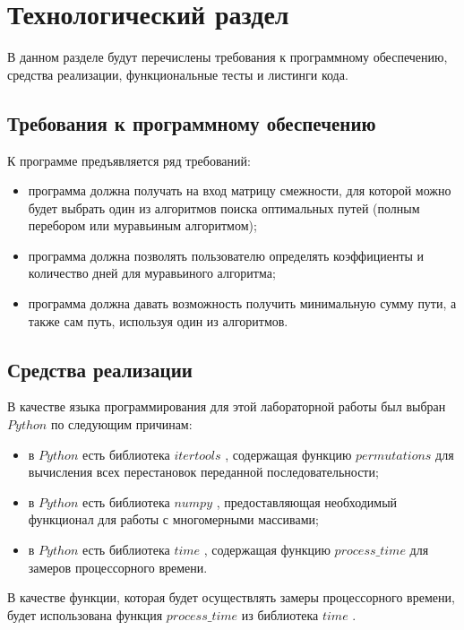 \chapter{Технологический раздел}

В данном разделе будут перечислены требования к программному обеспечению, средства реализации, функциональные тесты и листинги кода.

\section{Требования к программному обеспечению}

К программе предъявляется ряд требований:

\begin{itemize} [label=--]
	\item программа должна получать на вход матрицу смежности, для которой можно будет выбрать один из алгоритмов поиска оптимальных
	путей (полным перебором или муравьиным алгоритмом);
	\item программа должна позволять пользователю определять коэффициенты и количество дней для муравьиного алгоритма;
	\item программа должна давать возможность получить минимальную сумму пути, а также сам путь, используя один из алгоритмов.
\end{itemize}

\section{Средства реализации}

В качестве языка программирования для этой лабораторной работы был выбран $Python$ \cite{info_pl} по следующим причинам:

\begin{itemize}[label=--]
	\item в $Python$ есть библиотека $itertools$ \cite{info_itertools}, содержащая функцию $permutations$ для вычисления всех перестановок переданной последовательности;
	\item в $Python$ есть библиотека $numpy$ \cite{info_numpy}, предоставляющая необходимый функционал для работы с многомерными массивами;
	\item в $Python$ есть библиотека $time$ \cite{info_cpu_time_func}, содержащая функцию $process\_time$ для замеров процессорного времени.
\end{itemize}

В качестве функции, которая будет осуществлять замеры процессорного времени, будет использована функция $process\_time$ из библиотека $time$ \cite{info_cpu_time_func}.

